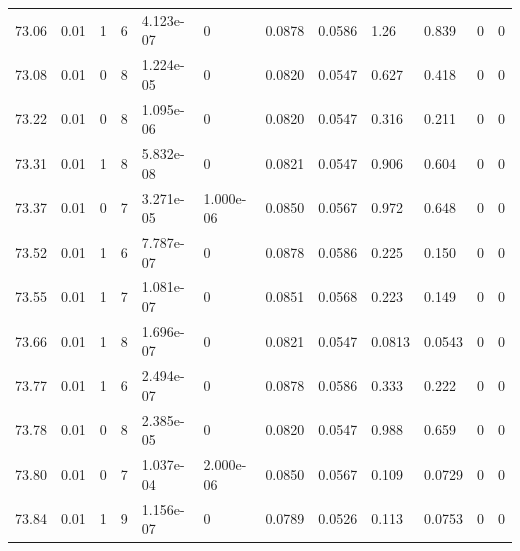 \documentclass[preview]{standalone}
\begin{document}
{{{{{{{{{{{{{{{{{{{\begin{tabular}{L{1.2cm}C{1.2cm} C{0.3cm}C{0.5cm} C{1.4cm}C{1.4cm} C{1.4cm}C{1.4cm} C{1.6cm}C{1.6cm} C{1.6cm}C{1.6cm}}
  73.06  &  0.01  & 1     &  6 &  4.123e-07  & 0  &  0.0878&   0.0586& 1.26 & 0.839   &  0 & 0  \\ 
  73.08  &  0.01  & 0     &  8 &  1.224e-05  & 0  &  0.0820&   0.0547& 0.627 & 0.418   &  0 & 0  \\ 
  73.22  &  0.01  & 0     &  8 &  1.095e-06  & 0  &  0.0820&   0.0547& 0.316 & 0.211   &  0 & 0  \\ 
  73.31  &  0.01  & 1     &  8 &  5.832e-08  & 0  &  0.0821&   0.0547& 0.906 & 0.604   &  0 & 0  \\ 
  73.37  &  0.01  & 0     &  7 &  3.271e-05  & 1.000e-06  &  0.0850&   0.0567& 0.972 & 0.648   &  0 & 0  \\ 
  73.52  &  0.01  & 1     &  6 &  7.787e-07  & 0  &  0.0878&   0.0586& 0.225 & 0.150   &  0 & 0  \\ 
  73.55  &  0.01  & 1     &  7 &  1.081e-07  & 0  &  0.0851&   0.0568& 0.223 & 0.149   &  0 & 0  \\ 
  73.66  &  0.01  & 1     &  8 &  1.696e-07  & 0  &  0.0821&   0.0547& 0.0813 & 0.0543   &  0 & 0  \\ 
  73.77  &  0.01  & 1     &  6 &  2.494e-07  & 0  &  0.0878&   0.0586& 0.333 & 0.222   &  0 & 0  \\ 
  73.78  &  0.01  & 0     &  8 &  2.385e-05  & 0  &  0.0820&   0.0547& 0.988 & 0.659   &  0 & 0  \\ 
  73.80  &  0.01  & 0     &  7 &  1.037e-04  & 2.000e-06  &  0.0850&   0.0567& 0.109 & 0.0729   &  0 & 0  \\ 
  73.84  &  0.01  & 1     &  9 &  1.156e-07  & 0  &  0.0789&   0.0526& 0.113 & 0.0753   &  0 & 0  \\ 
\hline 
\end{tabular} 

}}}}}}}}}}}}}}}}}}}
\end{document}
